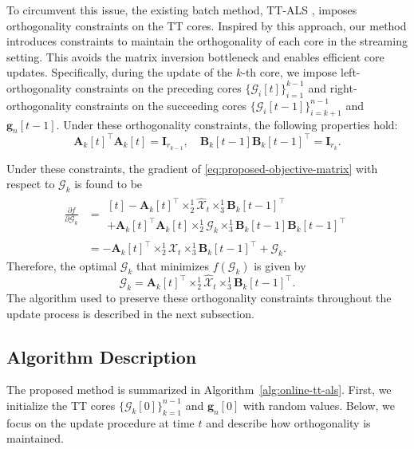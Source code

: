\documentclass[a4paper, 11pt]{article}
\newcommand{\ttimes}[2]{\times_{#1}^{#2}}
\theoremstyle{plain}
\theoremstyle{definition}
\theoremstyle{remark}
\begin{document}
To circumvent this issue, the existing batch method, TT-ALS \citep{TT-ALS}, imposes orthogonality constraints on the TT cores.
Inspired by this approach, our method introduces constraints to maintain the orthogonality of each core in the streaming setting.
This avoids the matrix inversion bottleneck and enables efficient core updates.
Specifically, during the update of the $k$-th core, we impose left-orthogonality constraints on the preceding cores $\{\mathcal{G}_i[t]\}_{i=1}^{k-1}$ and right-orthogonality constraints on the succeeding cores $\{\mathcal{G}_i[t-1]\}_{i=k+1}^{n-1}$ and $\bm{g}_n[t-1]$.
Under these orthogonality constraints, the following properties hold:
\begin{equation*}
    \mathbf{A}_k[t]^\top \mathbf{A}_k[t] = \mathbf{I}_{r_{k-1}}, \quad \mathbf{B}_k[t-1] \mathbf{B}_k[t-1]^\top = \mathbf{I}_{r_k}.
\end{equation*}

Under these constraints, the gradient of \eqref{eq:proposed-objective-matrix} with respect to $\mathcal{G}_k$ is found to be
\begin{align*}
  \frac{\partial f}{\partial \mathcal{G}_k} 
  &= \begin{multlined}[t]
        -\mathbf{A}_k[t]^\top \ttimes{2}{1} \widehat{\mathcal{X}}_t \ttimes{3}{1} \mathbf{B}_k[t-1]^\top \\
        + \mathbf{A}_k[t]^\top \mathbf{A}_k[t] \ttimes{2}{1} \mathcal{G}_k \ttimes{3}{1} \mathbf{B}_k[t-1] \mathbf{B}_k[t-1]^\top 
      \end{multlined} \\
  &= -\mathbf{A}_k[t]^\top \ttimes{2}{1} \widehat{\mathcal{X}}_t \ttimes{3}{1} \mathbf{B}_k[t-1]^\top + \mathcal{G}_k.
\end{align*}
Therefore, the optimal $\mathcal{G}_k$ that minimizes $f(\mathcal{G}_k)$ is given by
\begin{equation}
  \mathcal{G}_k = \mathbf{A}_k[t]^\top \ttimes{2}{1} \widehat{\mathcal{X}}_t \ttimes{3}{1} \mathbf{B}_k[t-1]^\top. \label{eq:proposed-core-update}
\end{equation}
The algorithm used to preserve these orthogonality constraints throughout the update process is described in the next subsection.

\subsection{Algorithm Description}
The proposed method is summarized in Algorithm~\ref{alg:online-tt-als}.
First, we initialize the TT cores $\{\mathcal{G}_k[0]\}_{k=1}^{n-1}$ and $\bm{g}_n[0]$ with random values.
Below, we focus on the update procedure at time $t$ and describe how orthogonality is maintained.
\end{document}
